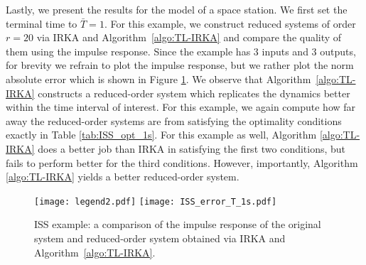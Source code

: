 \documentclass[a4paper,11pt, twoside]{article}
\makeatletter
\newcommand{\includetikz}[1]{%
	\tikzsetnextfilename{figure/#1}%
}
\newenvironment{customlegend}[1][]{%
	\begingroup
	\csname pgfplots@init@cleared@structures\endcsname
	\pgfplotsset{#1}%
}{%
	\csname pgfplots@createlegend\endcsname
	\endgroup
}%
\def\addlegendimage{\csname pgfplots@addlegendimage\endcsname}
\newlength\fheight
\newlength\fwidth
\makeatother
\begin{document}
Lastly, we present the results for the model of a space station.  We first set the terminal time to $\bar T = 1$.  For this example, we construct 
reduced systems of order $r = 20$ via IRKA and Algorithm~\ref{algo:TL-IRKA} and compare the quality of them using the impulse response. Since the 
example has $3$ inputs and $3$ outputs, for brevity we refrain to plot the impulse response, but we rather plot the norm absolute error which is shown 
in Figure \ref{fig:ISS_imp_1s}. We observe that Algorithm~\ref{algo:TL-IRKA} constructs a reduced-order system which replicates the dynamics better 
within the time interval of interest.  For this example, we again compute how far away the reduced-order systems are from satisfying the optimality 
conditions exactly in Table \ref{tab:ISS_opt_1s}. For this example as well, Algorithm \ref{algo:TL-IRKA} does a better job than IRKA in satisfying 
the first two conditions, but fails to perform better for the third conditions. However, importantly, Algorithm \ref{algo:TL-IRKA} yields a better 
reduced-order system. 


\begin{figure}[!tb]
	\centering
\texttt{[image: legend2.pdf]}
\centering
	\setlength\fheight{3cm}  \setlength\fwidth{5.25cm}
	\texttt{[image: ISS\_error\_T\_1s.pdf]}
	\caption{ISS example: a comparison of the impulse response of the original system and reduced-order system obtained via IRKA and 
Algorithm~\ref{algo:TL-IRKA}.}
	\label{fig:ISS_imp_1s}
\end{figure}
\end{document}
